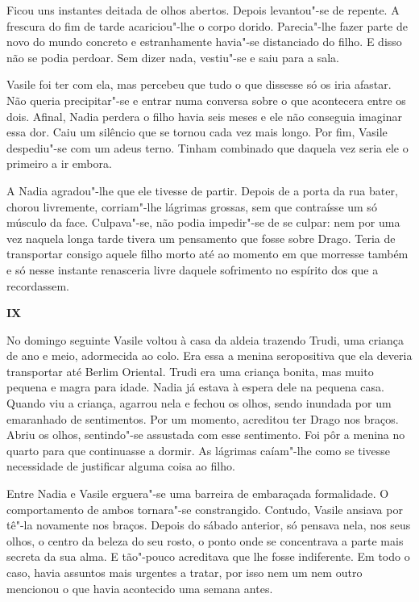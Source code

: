 Ficou uns instantes deitada de olhos abertos. Depois levantou"-se de
repente. A frescura do fim de tarde acariciou"-lhe o corpo dorido.
Parecia"-lhe fazer parte de novo do mundo concreto e estranhamente
havia"-se distanciado do filho. E disso não se podia perdoar. Sem dizer
nada, vestiu"-se e saiu para a sala.

Vasile foi ter com ela, mas percebeu que tudo o que dissesse só os iria
afastar. Não queria precipitar"-se e entrar numa conversa sobre o que
acontecera entre os dois. Afinal, Nadia perdera o filho havia seis
meses e ele não conseguia imaginar essa dor. Caiu um silêncio que se
tornou cada vez mais longo. Por fim, Vasile despediu"-se com um adeus
terno. Tinham combinado que daquela vez seria ele o primeiro a ir
embora.

A Nadia agradou"-lhe que ele tivesse de partir. Depois de a porta da rua
bater, chorou livremente, corriam"-lhe lágrimas grossas, sem que
contraísse um só músculo da face. Culpava"-se, não podia impedir"-se de se
culpar: nem por uma vez naquela longa tarde tivera um pensamento que
fosse sobre Drago. Teria de transportar consigo aquele filho morto até
ao momento em que morresse também e só nesse instante renasceria livre
daquele sofrimento no espírito dos que a recordassem.


\pagebreak
\thispagestyle{empty}
\movetooddpage
\vspace*{1.8cm}
\noindent{}\textbf{IX}

\bigskip

No domingo seguinte Vasile voltou à casa da aldeia trazendo Trudi, uma
criança de ano e meio, adormecida ao colo. Era essa a menina
seropositiva que ela deveria transportar até Berlim Oriental. Trudi
era uma criança bonita, mas muito pequena e magra para idade. Nadia já
estava à espera dele na pequena casa. Quando viu a criança, agarrou
nela e fechou os olhos, sendo inundada por um emaranhado de
sentimentos. Por um momento, acreditou ter Drago nos braços. Abriu os
olhos, sentindo"-se assustada com esse sentimento. Foi pôr a menina no
quarto para que continuasse a dormir. As lágrimas caíam"-lhe como se
tivesse necessidade de justificar alguma coisa ao filho.

Entre Nadia e Vasile erguera"-se uma barreira de embaraçada
formalidade. O comportamento de ambos tornara"-se constrangido. Contudo, Vasile ansiava por tê"-la novamente nos
braços. Depois do sábado anterior, só pensava nela, nos seus olhos, o
centro da beleza do seu rosto, o ponto onde se concentrava a parte mais
secreta da sua alma. E tão"-pouco acreditava que lhe fosse indiferente.
Em todo o caso, havia assuntos mais urgentes a tratar, por isso
nem um nem outro mencionou o que havia acontecido uma semana antes.


